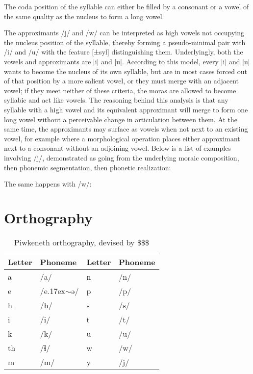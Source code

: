 \documentclass[executivepaper,10pt,twoside,openany,draft]{memoir}
\newcommand{\lang}{Piwkeneth}
\newcommand{\ttilde}{\raise.17ex\hbox{$\scriptstyle\sim$}}
\begin{document}
The coda position of the syllable can either be filled by a consonant or a vowel of the same quality as the nucleus to form a long vowel.

The approximants /j/ and /w/ can be interpreted as high vowels not occupying the nucleus position of the syllable, thereby forming a pseudo-minimal pair with /i/ and /u/ with the feature [±syl] distinguishing them. Underlyingly, both the vowels and approximants are |i| and |u|. According to this model, every |i| and |u| wants to become the nucleus of its own syllable, but are in most cases forced out of that position by a more salient vowel, or they must merge with an adjacent vowel; if they meet neither of these criteria, the moras are allowed to become syllabic and act like vowels. The reasoning behind this analysis is that any syllable with a high vowel and its equivalent approximant will merge to form one long vowel without a perceivable change in articulation between them. At the same time, the approximants may surface as vowels when not next to an existing vowel, for example where a morphological operation places either approximant next to a consonant without an adjoining vowel. Below is a list of examples involving /j/, demonstrated as going from the underlying moraic composition, then phonemic segmentation, then phonetic realization:


\noindent The same happens with /w/:


\newpage

\section{Orthography}

\begin{table}[ht]
    \centering
    \begin{tabular}{llll}
        \toprule
        Letter & Phoneme & Letter & Phoneme\\
        \midrule
        a & /a/ & n & /n/ \\
        e & /e\ttilde{}ə/ & p & /p/ \\
        h & /h/ & s & /s/ \\
        i & /i/ & t & /t/ \\
        k & /k/ & u & /u/ \\
        th& /ɬ/ & w & /w/ \\
        m & /m/ & y & /j/ \\
        \bottomrule
    \end{tabular}
    \caption{\lang{} orthography, devised by \$\$\$}
\end{table}
\end{document}
